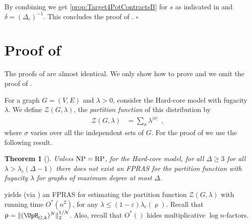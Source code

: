 \documentclass[11pt,reqno]{amsart}
\numberwithin{equation}{section}
\newtheorem{theorem}{Theorem}[section]
\newcommand{\bluepigment}[1]{{\color{blue(pigment)}#1}}
\newcommand{\cadmiumgreen}[1]{{\color{cadmiumgreen}#1}}
\newcommand{\darkmagenta}[1]{{\color{darkmagenta}#1}}
\newcommand{\goldenbrown}[1]{{\color{goldenbrown}#1}}
\newcommand{\maxDeg}{{\Delta}}
\newcommand{\PartFun}{\mathcal{Z}}
\newcommand{\dcritical}{{\Delta_c}}
\newcommand{\lcritical}{{\lambda_c}}
\newcommand{\pfs}{\darkmagenta{s}}
\newcommand{\nnorm}[3]{\goldenbrown{\|} #1\goldenbrown{\|}^{#2}_{#3}}
\newcommand{\NBMatrix}{\cadmiumgreen{\UpH}_{G,\kk}}
\newcommand{\spreadpoint}{\newpage}
\renewcommand{\spreadpoint}{}
\renewcommand{\bluepigment}[1]{#1}
\renewcommand{\cadmiumgreen}[1]{#1}
\renewcommand{\darkmagenta}[1]{#1}
\renewcommand{\goldenbrown}[1]{#1}
\newcommand{\kk}{\bluepigment{k}}
\renewcommand{\kk}{k}
\newcommand{\SingBound}{\uprho}
\begin{document}
By combining  we get 
\eqref{prop:Target4PotContractsB} for $\pfs$ as indicated in  and  $\delta=(\dcritical)^{-1}$. This concludes the proof of . 
\hfill $\square$

\spreadpoint

\newcommand{\blambda}{\mathbold{\lambda}}










\spreadpoint
\section{Proof of }\label{sec:thrm:HarndessTrans}

The proofs of  are almost identical. 
We only show how to prove  and we omit the proof of . 

For a graph $G=(V,E)$ and $\lambda>0$, consider the Hard-core model with fugacity $\lambda$.
We define $\PartFun(G,\lambda)$, the {\em partition function} of this distribution by
\begin{align}
\PartFun(G,\lambda)&=\sum\nolimits_{\sigma}\lambda^{|\sigma|}\enspace,
\end{align}
where $\sigma$ varies over all the independent sets of $G$. 
%
For the proof of  we use the following result. 

\begin{theorem}[\cite{GSV16Hardness,SS14}]\label{thrm:HarndessCounting}
Unless ${\rm NP} = {\rm RP}$, for the Hard-core model, for all $\maxDeg\geq 3$ for all 
$\lambda>\lcritical(\maxDeg-1)$ 
there does not exist an FPRAS for the partition function with fugacity $\lambda$ for graphs of 
maximum degree at most $\maxDeg$.
\end{theorem}





 yields (via \cite{JVV86,SVV09}) an FPRAS for estimating 
the partition function $\PartFun(G,\lambda)$ with running time $O^*(n^2)$, 
for any $\lambda\leq (1-\varepsilon)\lcritical(\SingBound)$. Recall that $\SingBound=\nnorm{ (\NBMatrix)^N}{1/N}{2}$.
Also, recall that $O^*()$ hides multiplicative $\log n$-factors.
\end{document}
